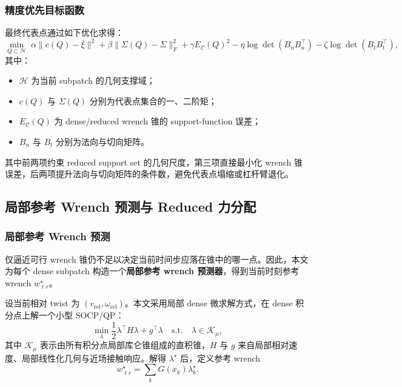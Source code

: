 \documentclass[UTF8,a4paper,11pt]{ctexart}
\begin{document}
\subsubsection{精度优先目标函数}

最终代表点通过如下优化求得：
\begin{equation}
\min_{Q\subset \mathcal{H}}
\;
\alpha \|c(Q)-\bar{\xi}\|^2
+\beta \|\Sigma(Q)-\Sigma\|_F^2
+\gamma E_{\mathcal{C}}(Q)^2
-\eta \log\det(B_n B_n^\top)
-\zeta \log\det(B_t B_t^\top),
\end{equation}
其中：
\begin{itemize}[leftmargin=2em]
    \item $\mathcal{H}$ 为当前 subpatch 的几何支撑域；
    \item $c(Q)$ 与 $\Sigma(Q)$ 分别为代表点集合的一、二阶矩；
    \item $E_{\mathcal{C}}(Q)$ 为 dense/reduced wrench 锥的 support-function 误差；
    \item $B_n$ 与 $B_t$ 分别为法向与切向矩阵。
\end{itemize}

其中前两项约束 reduced support set 的几何尺度，第三项直接最小化 wrench 锥误差，后两项提升法向与切向矩阵的条件数，避免代表点塌缩或杠杆臂退化。

\subsection{局部参考 Wrench 预测与 Reduced 力分配}

\subsubsection{局部参考 Wrench 预测}

仅逼近可行 wrench 锥仍不足以决定当前时间步应落在锥中的哪一点。因此，本文为每个 dense subpatch 构造一个\textbf{局部参考 wrench 预测器}，得到当前时刻参考 wrench $w_{\ell r}^\star$。

设当前相对 twist 为 $(v_{\mathrm{rel}}, \omega_{\mathrm{rel}})$。本文采用局部 dense 微求解方式，在 dense 积分点上解一个小型 SOCP/QP：
\begin{equation}
\min_{\lambda}
\frac{1}{2}\lambda^\top H \lambda + g^\top \lambda
\quad
\text{s.t.}\quad
\lambda \in \mathcal{K}_\mu,
\end{equation}
其中 $\mathcal{K}_\mu$ 表示由所有积分点局部库仑锥组成的直积锥，$H$ 与 $g$ 来自局部相对速度、局部线性化几何与近场接触响应。解得 $\lambda^\star$ 后，定义参考 wrench
\begin{equation}
 w_{\ell r}^\star
 =
 \sum_{k} G(x_k)\lambda_k^\star.
\end{equation}
\end{document}
